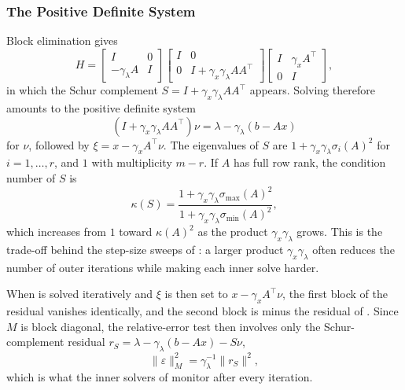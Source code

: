 \documentclass[11pt]{article}
\begin{document}
\subsubsection{The Positive Definite System}
Block elimination gives
\begin{equation*}
    H = \begin{bmatrix}
        I & 0 \\
        -\gamma_\lambda A & I
    \end{bmatrix}\begin{bmatrix}
        I & 0 \\
        0 & I + \gamma_x\gamma_\lambda AA^\top
    \end{bmatrix}\begin{bmatrix}
        I & \gamma_x A^\top \\ 0 & I
    \end{bmatrix},
\end{equation*}
in which the Schur complement $S = I + \gamma_x\gamma_\lambda AA^\top$ appears.
Solving  therefore amounts to the positive definite system
\begin{equation}\label{eq:psd-system}
    \left(I + \gamma_x\gamma_\lambda A A^\top\right)\nu = \lambda-\gamma_\lambda (b - Ax)
\end{equation}
for $\nu$, followed by $\xi = x - \gamma_xA^\top\nu$.
The eigenvalues of $S$ are $1 + \gamma_x\gamma_\lambda\sigma_i(A)^2$ for $i = 1, \ldots, r$, and $1$ with multiplicity $m - r$.
If $A$ has full row rank, the condition number of $S$ is
\begin{equation*}
    \kappa(S) = \frac{1 + \gamma_x\gamma_\lambda\sigma_{\max}(A)^2}{1 + \gamma_x\gamma_\lambda\sigma_{\min}(A)^2},
\end{equation*}
which increases from $1$ toward $\kappa(A)^2$ as the product $\gamma_x\gamma_\lambda$ grows.
This is the trade-off behind the step-size sweeps of : a larger product $\gamma_x\gamma_\lambda$ often reduces the number of outer iterations while making each inner solve harder.

When  is solved iteratively and $\xi$ is then set to $x - \gamma_x A^\top\nu$, the first block of the residual  vanishes identically, and the second block is minus the residual of .
Since $M$ is block diagonal, the relative-error test then involves only the Schur-complement residual $r_S = \lambda - \gamma_\lambda(b - Ax) - S\nu$,
\begin{equation}\label{eq:psd-residual-in-M-norm}
    \|\varepsilon\|_M^2 = \gamma_\lambda^{-1}\|r_S\|^2,
\end{equation}
which is what the inner solvers of  monitor after every iteration.
\end{document}
